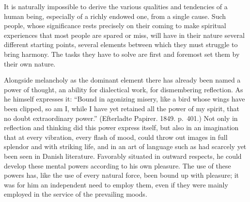 \documentclass[12pt,a4paper]{book}
\newcommand{\opage}[1]{\marginnote{\footnotesize\textit{[#1]}}}
\begin{document}
It is naturally impossible to derive the various qualities and tendencies
of a human being, especially of a richly endowed one, from a single cause.
Such people, whose significance rests precisely on their coming to make
spiritual experiences that most people are spared or miss, will have in
their nature several different starting points, several elements between
which they must struggle to bring harmony. The tasks they have to solve
are first and foremost set them by their own nature.

Alongside melancholy as the dominant element there has already been named
a power of thought, an ability for dialectical work, for dismembering
reflection. As he himself expresses it: ``Bound in agonizing misery, like
a bird whose wings have been clipped, so am I, while I have yet retained
all the power of my spirit, that no doubt extraordinary power.''
(Efterladte Papirer. 1849. p.~401.) Not only in reflection and thinking
did this power
\opage{33}express itself, but also in an imagination that at every
vibration, every flash of mood, could throw out images in full splendor
and with striking life, and in an art of language such as had scarcely
yet been seen in Danish literature. Favorably situated in outward
respects, he could develop these mental powers according to his own
pleasure. The use of these powers has, like the use of every natural
force, been bound up with pleasure; it was for him an independent need to
employ them, even if they were mainly employed in the service of the
prevailing moods.
\end{document}
